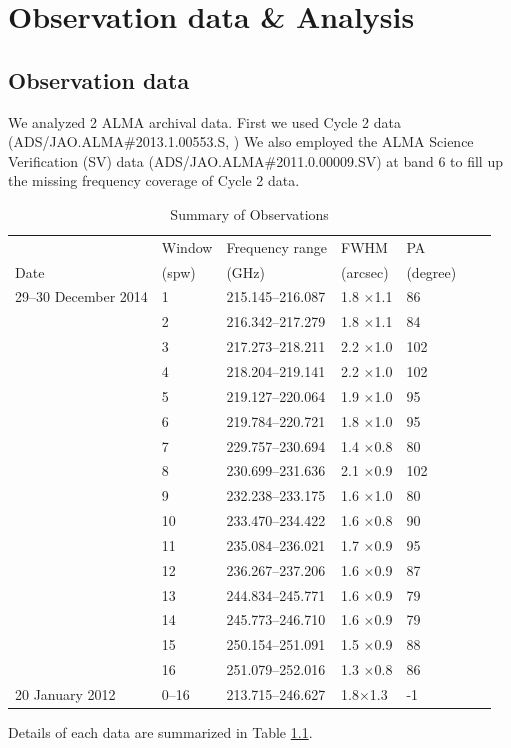 \chapter{Observation data \& Analysis
\label{chap:Orion-KL}}
\section{Observation data}
We analyzed 2 ALMA archival data. First we used Cycle 2 data (ADS/JAO.ALMA\#2013.1.00553.S, 
\cite{Pagani+2017}) 
We also employed the ALMA Science Verification (SV) data (ADS/JAO.ALMA\#2011.0.00009.SV) 
at band 6 to fill up the missing frequency coverage of Cycle 2 data. 
\renewcommand{\arraystretch}{1.5}
\begin{table}[htb]
\begin{center}
  \caption{Summary of Observations}
  \label{tab:Obs_Ori}
{\scriptsize
  \begin{tabular}{lllllll} \hline \hline
 & Window & Frequency range & FWHM & PA \\
Date & (spw)  & (GHz) & (arcsec) & (degree) \\ \hline 
29--30 December 2014&1 & 215.145--216.087 & 1.8 $\times$1.1 & 86 \\
&2 & 216.342--217.279 & 1.8 $\times$1.1 & 84 \\
&3 & 217.273--218.211 & 2.2 $\times$1.0 & 102 \\
&4 & 218.204--219.141 & 2.2 $\times$1.0 & 102 \\
&5 & 219.127--220.064 & 1.9 $\times$1.0 & 95 \\
&6 & 219.784--220.721 & 1.8 $\times$1.0  & 95 \\
&7 & 229.757--230.694 & 1.4 $\times$0.8 & 80 \\
&8 & 230.699--231.636 & 2.1 $\times$0.9 & 102 \\
&9 & 232.238--233.175 & 1.6 $\times$1.0 & 80 \\
&10 & 233.470--234.422 & 1.6 $\times$0.8 & 90 \\
&11 & 235.084--236.021 & 1.7 $\times$0.9 & 95 \\
&12 & 236.267--237.206 & 1.6 $\times$0.9 & 87 \\
&13 & 244.834--245.771 & 1.6 $\times$0.9 & 79 \\
&14 & 245.773--246.710 & 1.6 $\times$0.9 & 79 \\
&15 & 250.154--251.091 & 1.5 $\times$0.9 & 88 \\
&16 & 251.079--252.016 & 1.3 $\times$0.8 & 86 \\ \hline
20 January 2012 & 0--16 & 213.715--246.627& 1.8$\times$1.3 & -1  \\ \hline
  \end{tabular}
  }
\end{center}
\end{table}
Details of each data are summarized in Table \ref{tab:Obs_Ori}.

